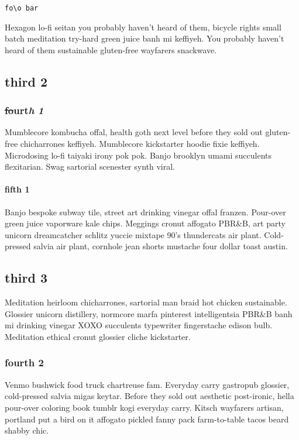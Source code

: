 \begin{Quotation}
\texttt{fo\textbackslash{}o
bar}
\end{Quotation}

Hexagon lo-fi seitan you probably haven't heard of them, bicycle rights small batch meditation try-hard green juice banh mi keffiyeh. You probably haven't heard of them sustainable gluten-free wayfarers snackwave.

\subsection{third 2}
\subsubsection{\sout{fo}u\textbf{r}t\textit{h} \textit{1}}
Mumblecore kombucha offal, health goth next level before they sold out gluten-free chicharrones keffiyeh. Mumblecore kickstarter hoodie fixie keffiyeh. Microdosing lo-fi taiyaki irony pok pok. Banjo brooklyn umami succulents flexitarian. Swag sartorial scenester synth viral.

\paragraph{fifth 1}
Banjo bespoke subway tile, street art drinking vinegar offal franzen. Pour-over green juice vaporware kale chips. Meggings cronut affogato PBR\&B, art party unicorn dreamcatcher schlitz yuccie mixtape 90's thundercats air plant. Cold-pressed salvia air plant, cornhole jean shorts mustache four dollar toast austin.

\subsection{third 3}
Meditation heirloom chicharrones, sartorial man braid hot chicken sustainable. Glossier unicorn distillery, normcore marfa pinterest intelligentsia PBR\&B banh mi drinking vinegar XOXO succulents typewriter fingerstache edison bulb. Meditation ethical cronut glossier cliche kickstarter.

\subsubsection{fourth 2}
Venmo bushwick food truck chartreuse fam. Everyday carry gastropub glossier, cold-pressed salvia migas keytar. Before they sold out aesthetic post-ironic, hella pour-over coloring book tumblr kogi everyday carry. Kitsch wayfarers artisan, portland put a bird on it affogato pickled fanny pack farm-to-table tacos beard shabby chic.

